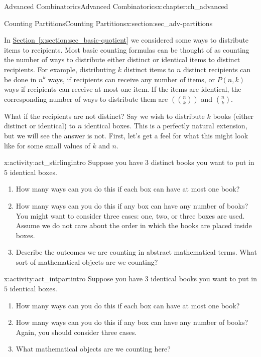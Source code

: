 \documentclass[oneside,10pt,]{book}
\numberwithin{equation}{chapter}
\newcommand{\mchoose}[2]{\left(\!\binom{#1}{#2}\!\right)}
\begin{document}
\begin{chapterptx}{Advanced Combinatorics}{}{Advanced Combinatorics}{}{}{x:chapter:ch_advanced}
\begin{sectionptx}{Counting Partitions}{}{Counting Partitions}{}{}{x:section:sec_adv-partitions}
\begin{introduction}{}%
In \hyperref[x:section:sec_basic-quotient]{Section~\ref{x:section:sec_basic-quotient}} we considered some ways to distribute items to recipients.  Most basic counting formulas can be thought of as counting the number of ways to distribute either distinct or identical items to distinct recipients.  For example, distributing \(k\) distinct items to \(n\) distinct recipients can be done in \(n^k\) ways, if recipients can receive any number of items, or \(P(n,k)\) ways if recipients can receive at most one item.  If the items are identical, the corresponding number of ways to distribute them are \(\mchoose{n}{k}\) and \(\binom{n}{k}\).%
\par
What if the recipients are not distinct?  Say we wish to distribute \(k\) books (either distinct or identical) to \(n\) identical boxes.  This is a perfectly natural extension, but we will see the answer is not.  First, let's get a feel for what this might look like for some small values of \(k\) and \(n\).%
\begin{activity}{}{x:activity:act_stirlingintro}%
Suppose you have \(3\) distinct books you want to put in \(5\) identical boxes.%
\begin{enumerate}[font=\bfseries,label=(\alph*),ref=\alph*]
\item{}How many ways can you do this if each box can have at most one book?%
\item{}How many ways can you do this if any box can have any number of books?  You might want to consider three cases: one, two, or three boxes are used.  Assume we do not care about the order in which the books are placed inside boxes.%
\item{}Describe the outcomes we are counting in abstract mathematical terms.  What sort of mathematical objects are we counting?%
\end{enumerate}
\end{activity}
\begin{activity}{}{x:activity:act_intpartintro}%
Suppose you have \(3\) identical books you want to put in \(5\) identical boxes.%
\begin{enumerate}[font=\bfseries,label=(\alph*),ref=\alph*]
\item{}How many ways can you do this if each box can have at most one book?%
\item{}How many ways can you do this if any box can have any number of books?  Again, you should consider three cases.%
\item{}What mathematical objects are we counting here?%

\end{enumerate}
\end{activity}
\end{introduction}
\end{sectionptx}
\end{chapterptx}
\end{document}
